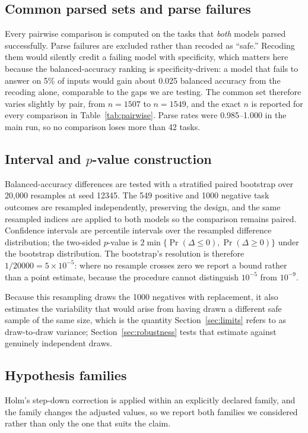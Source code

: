 \documentclass[computers,article,submit,moreauthors]{Definitions/mdpi}
\begin{document}
\subsection[\appendixname~\thesubsection]{Common parsed sets and parse failures}
Every pairwise comparison is computed on the tasks that \emph{both} models parsed successfully. Parse failures are excluded rather than recoded as ``safe.'' Recoding them would silently credit a failing model with specificity, which matters here because the balanced-accuracy ranking is specificity-driven: a model that fails to answer on 5\% of inputs would gain about 0.025 balanced accuracy from the recoding alone, comparable to the gaps we are testing. The common set therefore varies slightly by pair, from $n=1507$ to $n=1549$, and the exact $n$ is reported for every comparison in Table~\ref{tab:pairwise}. Parse rates were 0.985--1.000 in the main run, so no comparison loses more than 42 tasks.

\subsection[\appendixname~\thesubsection]{Interval and $p$-value construction}
Balanced-accuracy differences are tested with a stratified paired bootstrap over 20{,}000 resamples at seed 12345. The 549 positive and 1000 negative task outcomes are resampled independently, preserving the design, and the same resampled indices are applied to both models so the comparison remains paired. Confidence intervals are percentile intervals over the resampled difference distribution; the two-sided $p$-value is $2\min\{\Pr(\Delta\leq0),\Pr(\Delta\geq0)\}$ under the bootstrap distribution. The bootstrap's resolution is therefore $1/20000=5\times10^{-5}$: where no resample crosses zero we report a bound rather than a point estimate, because the procedure cannot distinguish $10^{-5}$ from $10^{-9}$.

Because this resampling draws the 1000 negatives with replacement, it also estimates the variability that would arise from having drawn a different safe sample of the same size, which is the quantity Section~\ref{sec:limits} refers to as draw-to-draw variance; Section~\ref{sec:robustness} tests that estimate against genuinely independent draws.

\subsection[\appendixname~\thesubsection]{Hypothesis families}
Holm's step-down correction is applied within an explicitly declared family, and the family changes the adjusted values, so we report both families we considered rather than only the one that suits the claim.
\end{document}
